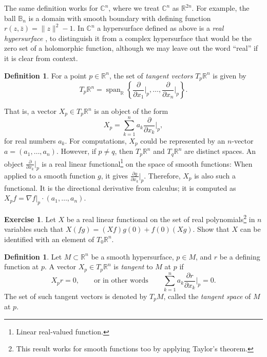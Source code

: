 \documentclass[12pt,openany]{book}
\newcommand{\snorm}[1]{\lVert {#1} \rVert}
\newcommand{\C}{{\mathbb{C}}}
\newcommand{\R}{{\mathbb{R}}}
\newcommand{\bB}{{\mathbb{B}}}
\newcommand{\myindex}[1]{#1\index{#1}}
\theoremstyle{plain}
\theoremstyle{remark}
\theoremstyle{definition}
\newtheorem{defn}[thm]{Definition}
\newenvironment{exbox}{%
    \def\FrameCommand{\vrule width 1pt \relax\hspace{10pt}}%
    \MakeFramed{\advance\hsize-\width\FrameRestore}%
}{%
    \endMakeFramed
}
\theoremstyle{exercise}
\newtheorem{exercise}{Exercise}[section]
\theoremstyle{example}
\begin{document}
The same definition works for $\C^n$, where we treat $\C^n$ as $\R^{2n}$.
For example, the ball $\bB_n$ is a domain with smooth boundary with defining
function $r(z,\bar{z}) = \snorm{z}^2-1$.
In $\C^n$
a hypersurface defined as above is a \emph{\myindex{real hypersurface}}%
,
to distinguish it from a complex hypersurface that would be the zero set of
a holomorphic function, although we may leave out the word ``real''
if it is clear from context.

\begin{defn}
For a point $p \in \R^n$, the set of \emph{tangent vectors} $T_p \R^n$ is given by
%
\begin{equation*}
T_p \R^n = \operatorname{span}_{\R} \left\{
\frac{\partial}{\partial x_1}\Big|_p,
\ldots,
\frac{\partial}{\partial x_n}\Big|_p \right\} .
\end{equation*}
\end{defn}

That is, a vector $X_p \in T_p \R^n$ is an object of the form
\begin{equation*}
X_p = \sum_{k=1}^n a_k
\frac{\partial}{\partial x_k}\Big|_p ,
\end{equation*}
for real numbers $a_k$.  For computations, $X_p$ could be represented
by an $n$-vector $a = (a_1,\ldots,a_n)$.  However, if $p \neq q$, then
$T_p \R^n$ and
$T_q \R^n$ are distinct spaces.
%
An object
$\frac{\partial}{\partial x_k}\big|_p$
is a real linear functional\footnote{Linear real-valued function.}
on the space of smooth functions:
When applied to a smooth function $g$, it gives
$\frac{\partial g}{\partial x_k} \big|_p$.  Therefore, $X_p$ is also such a
functional.  It is the directional derivative from calculus;
it is computed as $X_p f = \nabla f|_p \cdot (a_1,\ldots,a_n)$.

\begin{savenotes}
\begin{exbox}
\begin{exercise}
Let $X$ be a real linear functional on the set of real
polynomials\footnote{This result works for smooth functions too
by applying Taylor's theorem.} in $n$ variables
such that $X (fg) = (Xf) g(0) + f(0) (Xg)$.  Show that $X$
can be identified with an element of $T_0 \R^n$.
\end{exercise}
\end{exbox}
\end{savenotes}


\begin{defn}
Let $M \subset \R^n$ be a smooth hypersurface,
$p \in M$, and $r$ be a defining function at $p$.
A vector $X_p \in T_p \R^n$ is \emph{tangent}
to $M$ at $p$ if
\begin{equation*}
X_p r = 0, \qquad \text{or in other words} \qquad
\sum_{k=1}^n a_k \frac{\partial r}{\partial x_k} \Big|_p = 0 .
\end{equation*}
%
The set of such tangent vectors is denoted by $T_p M$,
called the \emph{\myindex{tangent space}} of $M$ at $p$.
\end{defn}
\end{document}
